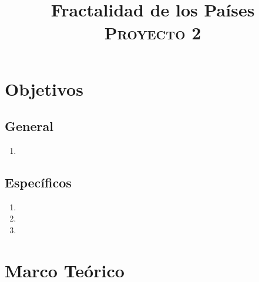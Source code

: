 \documentclass[conference]{IEEEtran}
\begin{document}
\title{Fractalidad de los Países \\
{\footnotesize \scshape{Proyecto 2}}
}

\author{
}



\maketitle

\begin{abstract}

\end{abstract}

\begin{IEEEkeywords}

\end{IEEEkeywords}

\section{Objetivos}

\subsection{General}
    \begin{enumerate}[1.]
        \item 
    \end{enumerate}
\subsection{Específicos}
    \begin{enumerate}
        \item 
        \item 
        \item 
    \end{enumerate}
    
\section{Marco Teórico}
\end{document}
